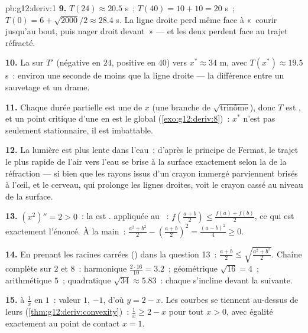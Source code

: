 \begin{solution}{pb:g12:deriv:1}
\textbf{9.} $T(24) \approx 20.5$ s~; $T(40) = 10 + 10 = 20$ s~;
$T(0) = 6 + \sqrt{2000}/2 \approx 28.4$ s. La ligne droite perd
même face à «~courir jusqu'au bout, puis nager droit devant~» ---
et les deux perdent face au trajet réfracté.

\textbf{10.} La  sur $T'$ (négative en $24$, positive en
$40$)  vers $x^* \approx 34$ m, avec
$T(x^*) \approx 19.5$ s~: environ une seconde de moins que la ligne
droite --- la différence entre un sauvetage et un drame.

\textbf{11.} Chaque durée partielle est une   de $x$
(une branche de $\sqrt{\text{trinôme}}$), donc $T$ est , et
un point critique d'une    en est le 
global (\cref{exo:g12:deriv:8})~: $x^*$ n'est pas seulement
stationnaire, il est imbattable.

\textbf{12.} La lumière est plus lente dans l'eau~; d'après le
principe de Fermat, le trajet le plus rapide de l'air vers l'eau se
brise à la surface exactement selon la  de la réfraction --- si
bien que les rayons issus d'un crayon immergé parviennent brisés à
l'œil, et le cerveau, qui prolonge les lignes droites, voit le
crayon cassé au niveau de la surface.

\textbf{13.} $(x^2)'' = 2 > 0$~: la  est . 
appliquée au ~: $f\left(\frac{a+b}{2}\right) \leq
\frac{f(a) + f(b)}{2}$, ce qui est exactement l'énoncé. À la main~:
$\frac{a^2 + b^2}{2} - \left(\frac{a+b}{2}\right)^2 =
\frac{(a - b)^2}{4} \geq 0$.

\textbf{14.} En prenant les racines carrées ()
dans la question 13~:
$\frac{a + b}{2} \leq \sqrt{\frac{a^2 + b^2}{2}}$. Chaîne complète
sur $2$ et $8$~: harmonique $\frac{2 \cdot 16}{10} = 3.2$~;
géométrique $\sqrt{16} = 4$~; arithmétique $5$~; quadratique
$\sqrt{34} \approx 5.83$~: chaque  s'incline devant la
suivante.

\textbf{15.}  à $\frac1x$ en $1$~: valeur $1$,  $-1$, d'où $y = 2 - x$. Les courbes  se tiennent
au-dessus de leurs 
(\cref{thm:g12:deriv:convexity})~: $\frac1x \geq 2 - x$ pour tout
$x > 0$, avec égalité exactement au point de contact $x = 1$.


\end{solution}
